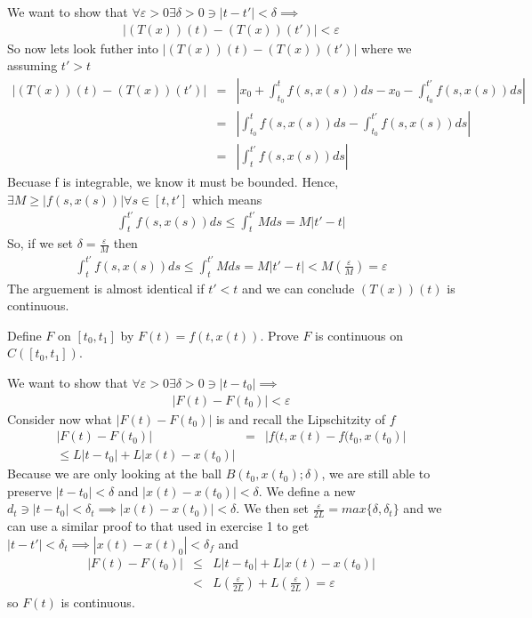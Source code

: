 \documentclass[11pt]{SelfArxOneColBMN}
\begin{document}
\begin{solution}
We want to show that $\forall \varepsilon > 0 \exists \delta > 0 \ni |t - t'| < \delta \implies$
\begin{eqnarray*}
  |(T(x))(t) - (T(x))(t')| < \varepsilon
\end{eqnarray*}
So now lets look futher into $|(T(x))(t) - (T(x))(t')|$ where we assuming $t' > t$
\begin{eqnarray*}
  |(T(x))(t) - (T(x))(t')| &=& |x_0 + \int_{t_0}^{t}f(s,x(s))ds - x_0 - \int_{t_0}^{t'}f(s,x(s))ds|\\
  &=& |\int_{t_0}^{t}f(s,x(s))ds - \int_{t_0}^{t'}f(s,x(s))ds| 
  \\
  &=& |\int_{t}^{t'}f(s,x(s))ds|
\end{eqnarray*}
Becuase f is integrable, we know it must be bounded. Hence, $\exists M \geq |f(s,x(s))| \forall s \in [t,t']$ which means
\begin{eqnarray*}
  \int_t^{t'}f(s,x(s))ds \leq \int_t^{t'}Mds = M|t' - t|
\end{eqnarray*}
So, if we set $\delta = \frac{\varepsilon}{M}$ then 
\begin{eqnarray*}
  \int_t^{t'}f(s,x(s))ds \leq \int_t^{t'}Mds = M|t' - t| < M(\frac{\varepsilon}{M}) = \varepsilon
\end{eqnarray*}
The arguement is almost identical if $t' < t$ and we can conclude $(T(x))(t)$ is continuous.
\end{solution}


\begin{exercise}
Define $F$ on $[t_0,t_1]$ by $F(t) = f(t,x(t))$.  Prove
$F$ is continuous on $C([t_0,t_1])$.
\end{exercise}

\begin{solution}
We want to show that $\forall \varepsilon > 0 \exists \delta > 0 \ni |t - t_0| \implies$
\begin{eqnarray*}
  |F(t) - F(t_0)| < \varepsilon
\end{eqnarray*}
Consider now what $|F(t) - F(t_0)|$ is and recall the Lipschitzity of $f$
\begin{eqnarray*}
  |F(t) - F(t_0)| &=& |f(t,x(t) - f(t_0,x(t_0)|\\
  \leq L|t - t_0| + L|x(t) - x(t_0)|
\end{eqnarray*}
Because we are only looking at the ball $B(t_0,x(t_0);\delta)$, we are still able to preserve $|t - t_0| < \delta$ and $|x(t) - x(t_0)| < \delta$. We define a new $d_t \ni |t - t_0| < \delta_t \implies |x(t) - x(t_0)| < \delta$. We then set $\frac{\varepsilon}{2L} = max\{\delta,\delta_t\}$ and we can use a similar proof to that used in exercise 1 to get $|t - t'| < \delta_t \implies |x(t) - x(t)_0| < \delta_f$ and 
\begin{eqnarray*}
  |F(t) - F(t_0)| &\leq& L|t - t_0| + L|x(t) - x(t_0)|\\
  &<& L(\frac{\varepsilon}{2L}) + L(\frac{\varepsilon}{2L}) = \varepsilon
\end{eqnarray*}
so $F(t)$ is continuous.
\end{solution}
\end{document}
